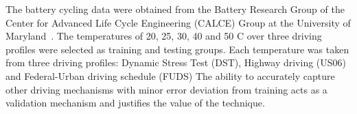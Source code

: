 %
%
The battery cycling data were obtained from the Battery Research Group of the
Center for Advanced Life Cycle Engineering (CALCE) Group
at the University of Maryland~\cite{noauthor_calce_2017}.
The temperatures of 20, 25, 30, 40 and 50 \textdegree{}C over three driving profiles were selected as training and testing groups.
Each temperature was taken from three driving profiles: Dynamic Stress Test (DST), Highway driving (US06) and Federal-Urban driving schedule (FUDS)
The ability to accurately capture other driving mechanisms with minor error deviation from training acts as a validation mechanism and justifies the value of the technique.

